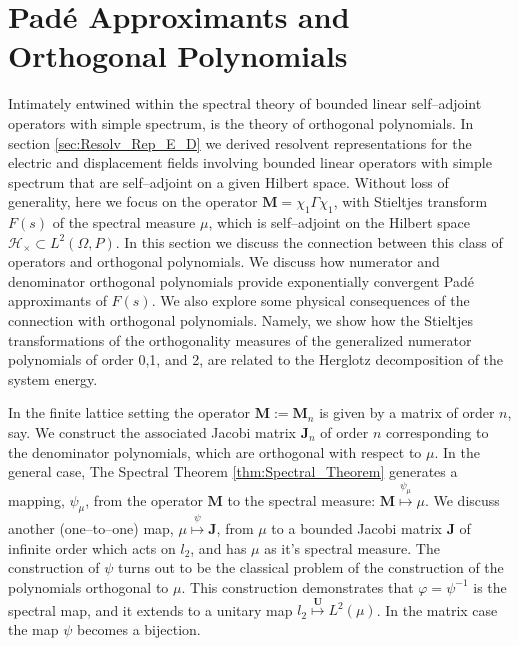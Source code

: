 \documentclass[english,12pt]{ttuthes}
\begin{document}
\section{Pad\'{e} Approximants and Orthogonal Polynomials}
\label{sec:Orthogonal_Polynomials}
%       
Intimately entwined within the spectral theory of bounded linear
self--adjoint operators with simple spectrum, is the theory of
orthogonal polynomials. In section \ref{sec:Resolv_Rep_E_D} we derived
resolvent representations for the electric and displacement fields
involving bounded linear operators with simple spectrum that are
self--adjoint on a given Hilbert space. Without loss of generality,
here we focus on the operator $\mathbf{M}=\chi_1\Gamma\chi_1$, with Stieltjes
transform $F(s)$ of the spectral measure $\mu$, which is self--adjoint
on the Hilbert space $\mathscr{H}_\times\subset L^2(\Omega,P)$. In this section we
discuss the connection between this class of operators and orthogonal  
polynomials. We discuss how numerator and denominator orthogonal
polynomials provide exponentially convergent Pad\'{e} approximants of
$F(s)$. We also explore some physical consequences of the connection
with orthogonal polynomials. Namely, we show how the Stieltjes
transformations of the orthogonality measures of the generalized
numerator polynomials of order 0,1, and 2, are related to the Herglotz 
decomposition of  the system energy. 

In the finite lattice setting the operator $\mathbf{M}:=\mathbf{M}_n$
is given by a matrix of order $n$, say. We construct the associated
Jacobi matrix $\mathbf{J}_n$ of order $n$ corresponding 
to the denominator polynomials, which are orthogonal with respect to
$\mu$. In the general case, The Spectral Theorem
\ref{thm:Spectral_Theorem} generates a mapping, $\psi_\mu$, from the operator
$\mathbf{M}$ to the spectral measure: $\mathbf{M}\stackrel{\psi_\mu}{\mapsto}\mu$. We
discuss another (one--to--one) map, $\mu\stackrel{\psi}{\mapsto}\mathbf{J}$, from
$\mu$ to a bounded Jacobi matrix $\mathbf{J}$ of infinite order which
acts on $l_2$, and has $\mu$ as it's spectral measure. The construction
of $\psi$ turns out to be the classical problem of the construction of
the polynomials orthogonal to $\mu$. This construction demonstrates that
$\varphi=\psi^{-1}$ is the spectral map, and it extends to a unitary map
$l_2\stackrel{\mathbf{U}}{\mapsto}L^2(\mu)$. In the matrix case the map $\psi$
becomes a bijection.  
\end{document}

